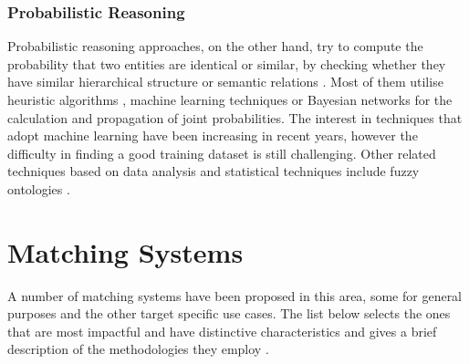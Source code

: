 \subsubsection{Probabilistic Reasoning}

Probabilistic reasoning approaches, on the other hand, try to compute the probability that two entities are identical or similar, by checking whether they have similar hierarchical structure or semantic relations \cite{DBLP:conf/esws/CastanoFLNM08}. Most of them utilise heuristic algorithms \cite{DBLP:conf/jist/NguyenI15}, machine learning techniques or Bayesian networks \cite{DBLP:conf/semweb/SvabS06} for the calculation and propagation of joint probabilities. The interest in techniques that adopt machine learning have been increasing in recent years, however the difficulty in finding a good training dataset is still challenging. Other related techniques based on data analysis and statistical techniques include fuzzy ontologies \cite{DBLP:conf/semweb/TodorovHG13}.


\section{Matching Systems}

A number of matching systems have been proposed in this area, some for general purposes and the other target specific use cases. The list below selects the ones that are most impactful and have distinctive characteristics and gives a brief description of the methodologies they employ \cite{euzenat2013d}.

